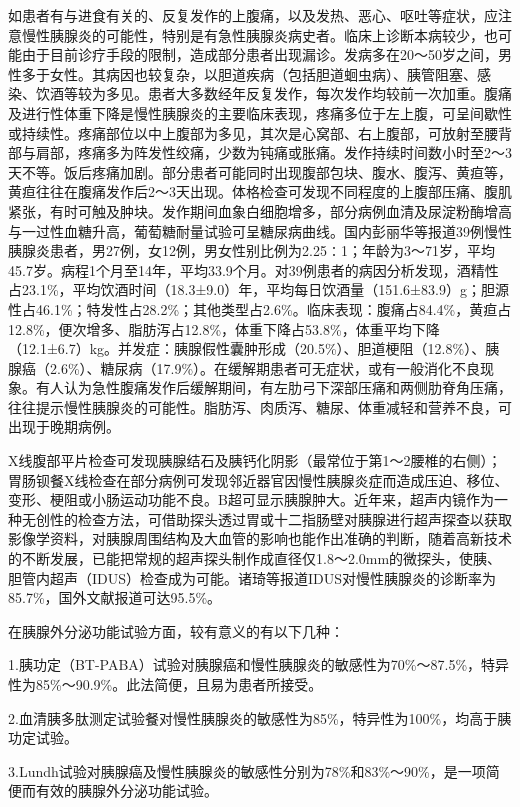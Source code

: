 如患者有与进食有关的、反复发作的上腹痛，以及发热、恶心、呕吐等症状，应注意慢性胰腺炎的可能性，特别是有急性胰腺炎病史者。临床上诊断本病较少，也可能由于目前诊疗手段的限制，造成部分患者出现漏诊。发病多在20～50岁之间，男性多于女性。其病因也较复杂，以胆道疾病（包括胆道蛔虫病）、胰管阻塞、感染、饮酒等较为多见。患者大多数经年反复发作，每次发作均较前一次加重。腹痛及进行性体重下降是慢性胰腺炎的主要临床表现，疼痛多位于左上腹，可呈间歇性或持续性。疼痛部位以中上腹部为多见，其次是心窝部、右上腹部，可放射至腰背部与肩部，疼痛多为阵发性绞痛，少数为钝痛或胀痛。发作持续时间数小时至2～3天不等。饭后疼痛加剧。部分患者可能同时出现腹部包块、腹水、腹泻、黄疸等，黄疸往往在腹痛发作后2～3天出现。体格检查可发现不同程度的上腹部压痛、腹肌紧张，有时可触及肿块。发作期间血象白细胞增多，部分病例血清及尿淀粉酶增高与一过性血糖升高，葡萄糖耐量试验可呈糖尿病曲线。国内彭丽华等报道39例慢性胰腺炎患者，男27例，女12例，男女性别比例为2.25∶1；年龄为3～71岁，平均45.7岁。病程1个月至14年，平均33.9个月。对39例患者的病因分析发现，酒精性占23.1\%，平均饮酒时间（18.3±9.0）年，平均每日饮酒量（151.6±83.9）g；胆源性占46.1\%；特发性占28.2\%；其他类型占2.6\%。临床表现：腹痛占84.4\%，黄疸占12.8\%，便次增多、脂肪泻占12.8\%，体重下降占53.8\%，体重平均下降（12.1±6.7）kg。并发症：胰腺假性囊肿形成（20.5\%）、胆道梗阻（12.8\%）、胰腺癌（2.6\%）、糖尿病（17.9\%）。在缓解期患者可无症状，或有一般消化不良现象。有人认为急性腹痛发作后缓解期间，有左肋弓下深部压痛和两侧肋脊角压痛，往往提示慢性胰腺炎的可能性。脂肪泻、肉质泻、糖尿、体重减轻和营养不良，可出现于晚期病例。

X线腹部平片检查可发现胰腺结石及胰钙化阴影（最常位于第1～2腰椎的右侧）；胃肠钡餐X线检查在部分病例可发现邻近器官因慢性胰腺炎症而造成压迫、移位、变形、梗阻或小肠运动功能不良。B超可显示胰腺肿大。近年来，超声内镜作为一种无创性的检查方法，可借助探头透过胃或十二指肠壁对胰腺进行超声探查以获取影像学资料，对胰腺周围结构及大血管的影响也能作出准确的判断，随着高新技术的不断发展，已能把常规的超声探头制作成直径仅1.8～2.0mm的微探头，使胰、胆管内超声（IDUS）检查成为可能。诸琦等报道IDUS对慢性胰腺炎的诊断率为85.7\%，国外文献报道可达95.5\%。

在胰腺外分泌功能试验方面，较有意义的有以下几种：

1.胰功定（BT-PABA）试验对胰腺癌和慢性胰腺炎的敏感性为70\%～87.5\%，特异性为85\%～90.9\%。此法简便，且易为患者所接受。

2.血清胰多肽测定试验餐对慢性胰腺炎的敏感性为85\%，特异性为100\%，均高于胰功定试验。

3.Lundh试验对胰腺癌及慢性胰腺炎的敏感性分别为78\%和83\%～90\%，是一项简便而有效的胰腺外分泌功能试验。


